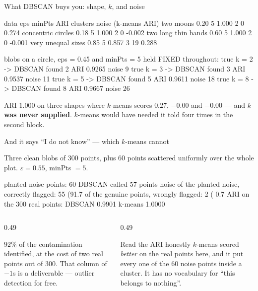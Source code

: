 \documentclass[aspectratio=169]{beamer}
\begin{document}
\begin{frame}[fragile,shrink=8]{What DBSCAN buys you: shape, $k$, and noise}
\begin{outblk}
  data                    eps  minPts   ARI    clusters  noise    (k-means ARI)
  two moons              0.20     5     1.000      2        0        0.274
  concentric circles     0.18     5     1.000      2        0       -0.002
  two long thin bands    0.60     5     1.000      2        0       -0.001
  very unequal sizes     0.85     5     0.857      3       19        0.288

  blobs on a circle, eps = 0.45 and minPts = 5 held FIXED throughout:
  true k = 2  -> DBSCAN found 2   ARI 0.9265   noise  9
  true k = 3  -> DBSCAN found 3   ARI 0.9537   noise 11
  true k = 5  -> DBSCAN found 5   ARI 0.9611   noise 18
  true k = 8  -> DBSCAN found 8   ARI 0.9667   noise 26
\end{outblk}
  \vspace{0.2em}
  \begin{exampleblock}{}
    \centering
    ARI $1.000$ on three shapes where $k$-means scores $0.27$, $-0.00$ and
    $-0.00$ --- and \textbf{$k$ was never supplied}. $k$-means would have
    needed it told four times in the second block.
  \end{exampleblock}
\end{frame}

\begin{frame}[fragile,shrink=8]{And it says ``I do not know'' --- which $k$-means cannot}
  \begin{center}\small
    Three clean blobs of $300$ points, plus $60$ points scattered uniformly
    over the whole plot. $\varepsilon = 0.55$, minPts $= 5$.
  \end{center}
\begin{outblk}
  planted noise points: 60   DBSCAN called 57 points noise
  of the planted noise, correctly flagged: 55 (91.7%
  of the genuine points, wrongly flagged:   2 ( 0.7%
  ARI on the 300 real points: DBSCAN 0.9901   k-means 1.0000
\end{outblk}
  \vspace{0.2em}
  \begin{columns}[T]
    \begin{column}{0.49\textwidth}
      \begin{exampleblock}{}
        \small $92\%$ of the contamination identified, at the cost of two
        real points out of $300$. That column of $-1$s is a deliverable ---
        outlier detection for free.
      \end{exampleblock}
    \end{column}
    \begin{column}{0.49\textwidth}
      \begin{alertblock}{Read the ARI honestly}
        \small $k$-means scored \emph{better} on the real points here, and it
        put every one of the $60$ noise points inside a cluster. It has no
        vocabulary for ``this belongs to nothing''.
      \end{alertblock}
    \end{column}
  \end{columns}
\end{frame}
\end{document}
